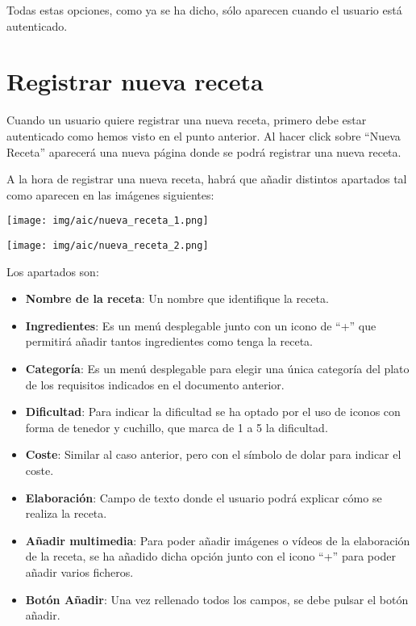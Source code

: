 \documentclass{\ClassPath/viu-tfm-template}
\begin{document}
Todas estas opciones, como ya se ha dicho, sólo aparecen cuando el usuario está autenticado.


\section{Registrar nueva receta}

Cuando un usuario quiere registrar una nueva receta, primero debe estar autenticado como hemos visto en el punto anterior. Al hacer click sobre “{\color{maincolor}Nueva Receta}” aparecerá una nueva página donde se podrá registrar una nueva receta.

A la hora de registrar una nueva receta, habrá que añadir distintos apartados tal como aparecen en las imágenes siguientes:


    \begin{center}
        \vspace{-10pt}
        \texttt{[image: img/aic/nueva\_receta\_1.png]}
        \vspace{-20pt}
    \end{center}

    \begin{center}
        \vspace{-10pt}
        \texttt{[image: img/aic/nueva\_receta\_2.png]}
        \vspace{-20pt}
    \end{center}

Los apartados son:

\begin{itemize}
    \item \textbf{Nombre de la receta}: Un nombre que identifique la receta.
    \item \textbf{Ingredientes}: Es un menú desplegable junto con un icono de “+” que permitirá añadir tantos ingredientes como tenga la receta.
    \item \textbf{Categoría}: Es un menú desplegable para elegir una única categoría del plato de los requisitos indicados en el documento anterior.
    \item \textbf{Dificultad}: Para indicar la dificultad se ha optado por el uso de iconos con forma de tenedor y cuchillo, que marca de 1 a 5 la dificultad.
    \item \textbf{Coste}: Similar al caso anterior, pero con el símbolo de dolar para indicar el coste.
    \item \textbf{Elaboración}: Campo de texto donde el usuario podrá explicar cómo se realiza la receta.
    \item \textbf{Añadir multimedia}: Para poder añadir imágenes o vídeos de  la elaboración de la receta, se ha añadido dicha opción junto con el icono “+” para poder añadir varios ficheros.
    \item \textbf{Botón Añadir}: Una vez rellenado todos los campos, se debe pulsar el botón añadir.
\end{itemize}
\end{document}
